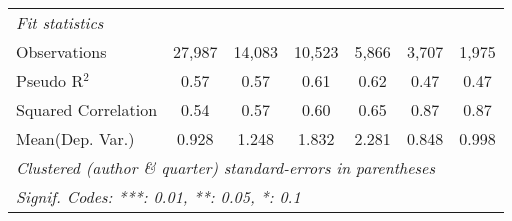 \begin{tabular}{lcccccc}
   \midrule
   \emph{Fit statistics}\\
   Observations                                               & 27,987        & 14,083        & 10,523       & 5,866   & 3,707          & 1,975\\  
   Pseudo R$^2$                                               & 0.57          & 0.57          & 0.61         & 0.62    & 0.47           & 0.47\\  
   Squared Correlation                                        & 0.54          & 0.57          & 0.60         & 0.65    & 0.87           & 0.87\\  
Mean(Dep. Var.) & 0.928 & 1.248 & 1.832 & 2.281 & 0.848 & 0.998 \\
   \midrule \midrule
   \multicolumn{7}{l}{\emph{Clustered (author \& quarter) standard-errors in parentheses}}\\
   \multicolumn{7}{l}{\emph{Signif. Codes: ***: 0.01, **: 0.05, *: 0.1}}\\
\end{tabular}
\par\endgroup
